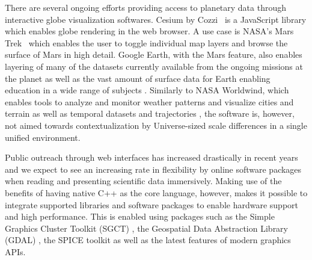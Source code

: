 \documentclass[journal]{vgtc}                %
\newcommand{\kallecomment}[1]{\textbf{[-Kalle-~}
    \textcolor{orange}{#1}
    \textbf{~]}}
\newcommand{\plgrem}[1]{\textcolor{blue}{~\textbf{!!}~}}
\begin{document}
There are several ongoing efforts providing access to planetary data through interactive globe visualization softwares. Cesium by Cozzi~\cite{cozzi2013cesium} is a JavaScript library which enables globe rendering in the web browser.
A use case is NASA's Mars Trek~\cite{marstrek} which enables the user to toggle individual map layers and browse the surface of Mars in high detail.
Google Earth, with the Mars feature, also enables layering of many of the datasets currently available from the ongoing missions at the planet as well as the vast amount of surface data for Earth enabling education in a wide range of subjects \cite{patterson2007google}. Similarly to NASA Worldwind, which enables tools to analyze and monitor weather patterns and visualize cities and terrain as well as temporal datasets and trajectories \cite{hogan2006nasa}, the software is, however, not aimed towards contextualization by Universe-sized scale differences in a single unified environment.


Public outreach through web interfaces has increased drastically in recent years and we expect to see an increasing rate in flexibility by online software packages when reading and presenting scientific data immersively.
Making use of the benefits of having native C++ as the core language, however, makes it possible to integrate supported libraries and software packages to enable hardware support and high performance. This is enabled using packages such as the Simple Graphics Cluster Toolkit (SGCT) \cite{sgct}, the Geospatial Data Abstraction Library (GDAL) \cite{warmerdam2008geospatial}, the SPICE toolkit \cite{acton1996ancillary} as well as the latest features of modern graphics APIs.



\end{document}
